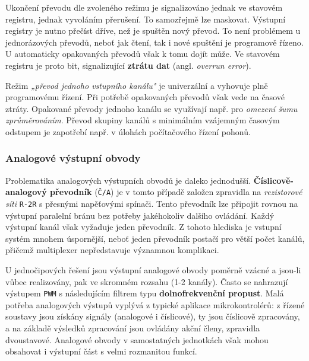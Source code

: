       Ukončení převodu dle zvoleného režimu je signalizováno jednak ve stavovém registru, jednak 
      vyvoláním přerušení. To samozřejmě lze maskovat. Výstupní registry je nutno přečíst dříve, 
      než je spuštěn nový převod. To není problémem u jednorázových převodů, neboť jak čtení, tak i 
      nové spuštění je programově řízeno. U automaticky opakovaných převodů však k tomu dojít může. 
      Ve stavovém registru je proto bit, signalizující \textbf{ztrátu dat} (angl. \emph{overrun 
      error}).
      
      Režim \emph{„převod jednoho vstupního kanálu"} je univerzální a vyhovuje plně programovému 
      řízení. Při potřebě opakovaných převodů však vede na časové ztráty. Opakované převody jednoho 
      kanálu se využívají např. pro \emph{omezení šumu zprůměrováním}. Převod skupiny kanálů s 
      minimálním vzájemným časovým odstupem je zapotřebí např. v úlohách počítačového řízení 
      pohonů.    
      
      \subsubsection{Analogové výstupní obvody}
        Problematika analogových výstupních obvodů je daleko jednodušší. 
        \textbf{Číslicově-analogový převodník} (\texttt{Č/A}) je v tomto případě založen zpravidla 
        na \emph{rezistorové síti} \texttt{R-2R} s přesnými napěťovými spínači. Tento převodník lze 
        připojit rovnou na výstupní paralelní bránu bez potřeby jakéhokoliv dalšího ovládání. Každý 
        výstupní kanál však vyžaduje jeden převodník. Z tohoto hlediska je vstupní systém mnohem 
        úspornější, neboť jeden převodník postačí pro větší počet kanálů, přičemž multiplexer 
        nepředstavuje významnou komplikaci.
        
        U jednočipových řešení jsou výstupní analogové obvody poměrně vzácné a jsou-li vůbec 
        realizovány, pak ve skromném rozsahu (1-2 kanály). Často se nahrazují výstupem \texttt{PWM} 
        s následujícím filtrem typu \textbf{dolnofrekvenční propust}. Malá potřeba analogových 
        výstupů vyplývá z typické aplikace mikrokontrolérů: z řízené soustavy jsou získány signály 
        (analogové i číslicové), ty jsou číslicově zpracovány, a na základě výsledků zpracování 
        jsou ovládány akční členy, zpravidla dvoustavové. Analogové obvody v samostatných 
        jednotkách však mohou obsahovat i výstupní část s velmi rozmanitou funkcí.
